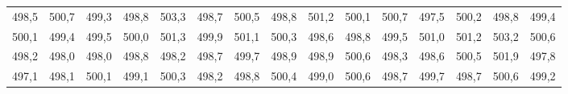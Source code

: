 \begin{longtable}{rrrrrrrrrrrrrrr}
498,5 & 500,7 & 499,3 & 498,8 & 503,3 & 498,7 & 500,5 & 498,8 & 501,2 & 500,1 & 500,7 & 497,5 & 500,2 & 498,8 & 499,4 \\
500,1 & 499,4 & 499,5 & 500,0 & 501,3 & 499,9 & 501,1 & 500,3 & 498,6 & 498,8 & 499,5 & 501,0 & 501,2 & 503,2 & 500,6 \\
498,2 & 498,0 & 498,0 & 498,8 & 498,2 & 498,7 & 499,7 & 498,9 & 498,9 & 500,6 & 498,3 & 498,6 & 500,5 & 501,9 & 497,8 \\
497,1 & 498,1 & 500,1 & 499,1 & 500,3 & 498,2 & 498,8 & 500,4 & 499,0 & 500,6 & 498,7 & 499,7 & 498,7 & 500,6 & 499,2 \\
\end{longtable}
